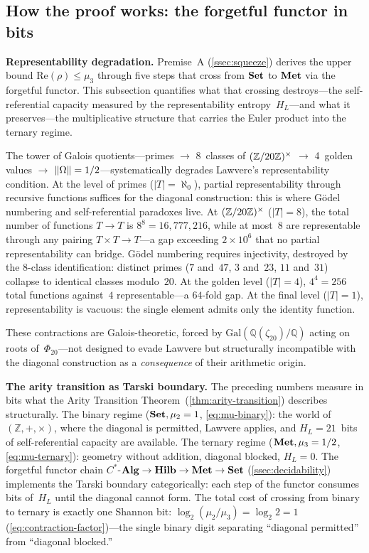 \subsection{How the proof works: the forgetful functor in
bits}\label{ssec:comp-landscape}

\smallskip\noindent\textbf{Representability degradation.}
Premise~A (\cref{ssec:squeeze}) derives the upper bound
$\mathrm{Re}(\rho)\le\mu_3$ through five steps that cross from $\mathbf{Set}$
to $\mathbf{Met}$ via the forgetful functor.  This subsection quantifies what
that crossing destroys---the self-referential capacity measured by the
representability entropy~$H_L$---and what it preserves---the
multiplicative structure that carries the Euler product into the
ternary regime.

The tower of Galois quotients---primes $\to$ 8~classes of $(\mathbb{Z}/20\mathbb{Z})^\times$
$\to$ 4~golden values $\to$ $\|\Omega\|=1/2$---systematically
degrades Lawvere's representability condition.  At the level of primes
($|T|=\aleph_0$), partial representability through recursive functions
suffices for the diagonal construction: this is where G\"odel numbering
and self-referential paradoxes live.  At $(\mathbb{Z}/20\mathbb{Z})^\times$ ($|T|=8$), the total
number of functions $T\to T$ is $8^8 = 16{,}777{,}216$, while at most~$8$
are representable through any pairing $T\times T\to T$---a gap exceeding
$2\times 10^6$ that no partial representability can bridge.  G\"odel
numbering requires injectivity, destroyed by the $8$-class
identification: distinct primes ($7$ and~$47$, $3$ and~$23$, $11$
and~$31$) collapse to identical classes modulo~$20$.  At the golden level
($|T|=4$), $4^4=256$ total functions against~$4$ representable---a
$64$-fold gap.  At the final level ($|T|=1$), representability
is vacuous: the single element admits only the identity function.

These contractions are Galois-theoretic, forced by
$\mathrm{Gal}(\mathbb{Q}(\zeta_{20})/\mathbb{Q})$ acting on roots
of~$\Phi_{20}$---not designed to evade Lawvere but structurally
incompatible with the diagonal construction as a \emph{consequence} of
their arithmetic origin.

\smallskip\noindent\textbf{The arity transition as Tarski boundary.}
The preceding numbers measure in bits what the Arity Transition
Theorem~(\cref{thm:arity-transition}) describes structurally.
The binary regime ($\mathbf{Set}, \mu_2=1$, \cref{eq:mu-binary}): the world of
$(\mathbb{Z},+,\times)$, where the diagonal is permitted, Lawvere
applies, and $H_L = 21$~bits of self-referential capacity are
available.  The ternary regime ($\mathbf{Met}, \mu_3=1/2$, \cref{eq:mu-ternary}):
geometry without addition, diagonal blocked, $H_L = 0$.  The
forgetful functor chain
$C^*$-$\mathbf{Alg}\to\mathbf{Hilb}\to\mathbf{Met}\to\mathbf{Set}$
(\cref{ssec:decidability}) implements the Tarski boundary
categorically: each step of the functor consumes bits of~$H_L$ until
the diagonal cannot form.  The total cost of crossing from binary to
ternary is exactly one Shannon bit: $\log_2(\mu_2/\mu_3)=\log_2 2 = 1$
(\cref{eq:contraction-factor})---the single binary digit
separating ``diagonal permitted'' from ``diagonal blocked.''

